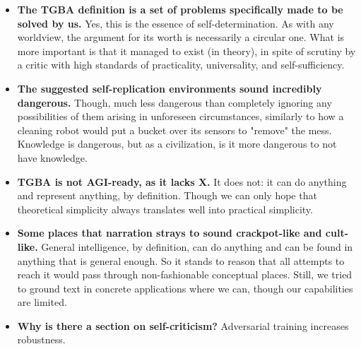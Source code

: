 \documentclass{article}
\begin{document}
\begin{itemize}
\item \textbf{The TGBA definition is a set of problems specifically made to be solved by us.} Yes, this is the essence of self-determination. As with any worldview, the argument for its worth is necessarily a circular one. What is more important is that it managed to exist (in theory), in spite of scrutiny by a critic with high standards of practicality, universality, and self-sufficiency.
\item \textbf{The suggested self-replication environments sound incredibly dangerous.} Though, much less dangerous than completely ignoring any possibilities of them arising in unforeseen circumstances, similarly to how a cleaning robot would put a bucket over its sensors to "remove" the mess. Knowledge is dangerous, but as a civilization, is it more dangerous to not have knowledge.
\item \textbf{TGBA is not AGI-ready, as it lacks X.} It does not: it can do anything and represent anything, by definition. Though we can only hope that theoretical simplicity always translates well into practical simplicity.
\item \textbf{Some places that narration strays to sound crackpot-like and cult-like.} General intelligence, by definition, can do anything and can be found in anything that is general enough. So it stands to reason that all attempts to reach it would pass through non-fashionable conceptual places. Still, we tried to ground text in concrete applications where we can, though our capabilities are limited.
\item \textbf{Why is there a section on self-criticism?} Adversarial training increases robustness.
\end{itemize}

\printbibliography
\end{document}
